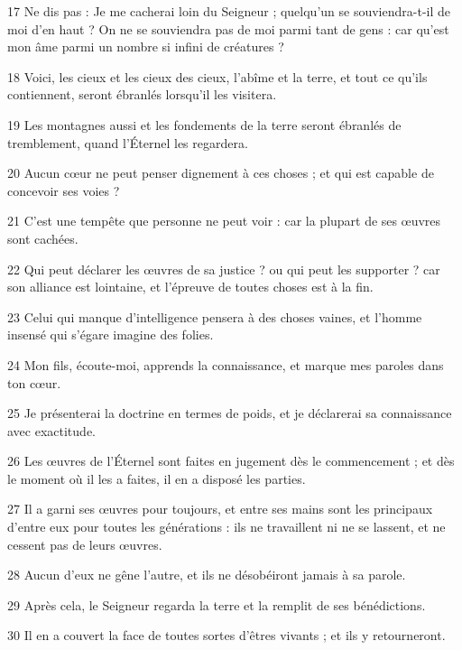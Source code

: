 \par 17 Ne dis pas : Je me cacherai loin du Seigneur ; quelqu'un se souviendra-t-il de moi d'en haut ? On ne se souviendra pas de moi parmi tant de gens : car qu'est mon âme parmi un nombre si infini de créatures ?
\par 18 Voici, les cieux et les cieux des cieux, l'abîme et la terre, et tout ce qu'ils contiennent, seront ébranlés lorsqu'il les visitera.
\par 19 Les montagnes aussi et les fondements de la terre seront ébranlés de tremblement, quand l'Éternel les regardera.
\par 20 Aucun cœur ne peut penser dignement à ces choses ; et qui est capable de concevoir ses voies ?
\par 21 C'est une tempête que personne ne peut voir : car la plupart de ses œuvres sont cachées.
\par 22 Qui peut déclarer les œuvres de sa justice ? ou qui peut les supporter ? car son alliance est lointaine, et l'épreuve de toutes choses est à la fin.
\par 23 Celui qui manque d'intelligence pensera à des choses vaines, et l'homme insensé qui s'égare imagine des folies.
\par 24 Mon fils, écoute-moi, apprends la connaissance, et marque mes paroles dans ton cœur.
\par 25 Je présenterai la doctrine en termes de poids, et je déclarerai sa connaissance avec exactitude.
\par 26 Les œuvres de l'Éternel sont faites en jugement dès le commencement ; et dès le moment où il les a faites, il en a disposé les parties.
\par 27 Il a garni ses œuvres pour toujours, et entre ses mains sont les principaux d'entre eux pour toutes les générations : ils ne travaillent ni ne se lassent, et ne cessent pas de leurs œuvres.
\par 28 Aucun d'eux ne gêne l'autre, et ils ne désobéiront jamais à sa parole.
\par 29 Après cela, le Seigneur regarda la terre et la remplit de ses bénédictions.
\par 30 Il en a couvert la face de toutes sortes d'êtres vivants ; et ils y retourneront.


